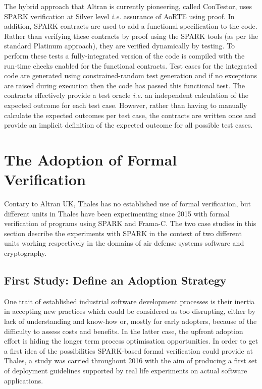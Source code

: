 \documentclass{eceasst}
\newcommand{\ie}{\textit{i.e.}\xspace}
\begin{document}
The hybrid approach that Altran is currently pioneering, called ConTestor, uses
SPARK verification at Silver level \ie assurance of AoRTE using proof. In
addition, SPARK contracts are used to add a functional specification to the
code. Rather than verifying these contracts by proof using the SPARK tools (as
per the standard Platinum approach), they are verified dynamically by
testing. To perform these tests a fully-integrated version of the code is
compiled with the run-time checks enabled for the functional contracts. Test
cases for the integrated code are generated using constrained-random test
generation and if no exceptions are raised during execution then the code has
passed this functional test. The contracts effectively provide a test oracle
\ie an independent calculation of the expected outcome for each test
case. However, rather than having to manually calculate the expected outcomes
per test case, the contracts are written once and provide an implicit
definition of the expected outcome for all possible test cases.

\section{The Adoption of Formal Verification}
\label{sec:adoption}

Contary to Altran UK, Thales has no established use of formal verification, but
different units in Thales have been experimenting since 2015 with formal
verification of programs using SPARK and Frama-C. The two case studies in this
section describe the experiments with SPARK in the context of two different
units working respectively in the domains of air defense systems software and cryptography.

\subsection{First Study: Define an Adoption Strategy}

One trait of established industrial software development processes is their
inertia in accepting new practices which could be considered as too disrupting,
either by lack of understanding and know-how or, mostly for early adopters,
because of the difficulty to assess costs and benefits. In the latter case, the
upfront adoption effort is hiding the longer term process optimisation
opportunities. In order to get a first idea of the possibilities SPARK-based
formal verification could provide at Thales, a study was carried throughout
2016 with the aim of producing a first set of deployment guidelines supported
by real life experiments on actual software applications.
\end{document}
